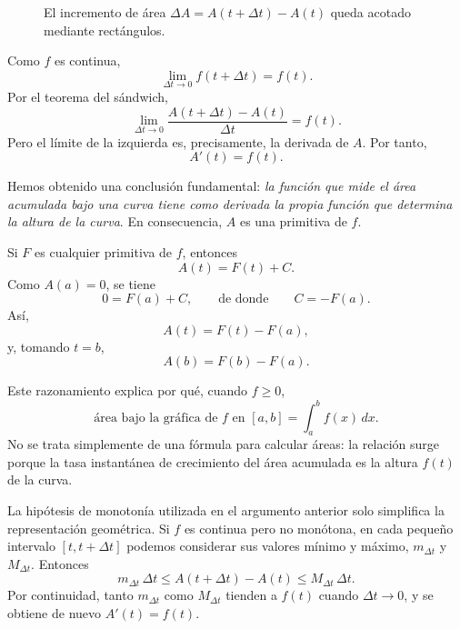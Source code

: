 \begin{figure}[htbp]
\centering
{}
\caption{El incremento de área $\Delta A=A(t+\Delta t)-A(t)$ queda acotado mediante rectángulos.}
\label{fig:incremento-area}
\end{figure}

Como $f$ es continua,
\[
\lim_{\Delta t\to0}f(t+\Delta t)=f(t).
\]
Por el teorema del sándwich,
\[
\lim_{\Delta t\to0}
\frac{A(t+\Delta t)-A(t)}{\Delta t}
=f(t).
\]
Pero el límite de la izquierda es, precisamente, la derivada de $A$. Por tanto,
\[
\boxed{A'(t)=f(t).}
\]

Hemos obtenido una conclusión fundamental: \emph{la función que mide el área acumulada bajo una curva tiene como derivada la propia función que determina la altura de la curva}. En consecuencia, $A$ es una primitiva de $f$.

Si $F$ es cualquier primitiva de $f$, entonces
\[
A(t)=F(t)+C.
\]
Como $A(a)=0$, se tiene
\[
0=F(a)+C,
\qquad\text{de donde}\qquad
C=-F(a).
\]
Así,
\[
A(t)=F(t)-F(a),
\]
y, tomando $t=b$,
\[
\boxed{A(b)=F(b)-F(a).}
\]

Este razonamiento explica por qué, cuando $f\geq0$,
\[
\boxed{\text{área bajo la gráfica de $f$ en $[a,b]$}=\int_a^b f(x)\,dx.}
\]
No se trata simplemente de una fórmula para calcular áreas: la relación surge porque la tasa instantánea de crecimiento del área acumulada es la altura $f(t)$ de la curva.

La hipótesis de monotonía utilizada en el argumento anterior solo simplifica la representación geométrica. Si $f$ es continua pero no monótona, en cada pequeño intervalo $[t,t+\Delta t]$ podemos considerar sus valores mínimo y máximo, $m_{\Delta t}$ y $M_{\Delta t}$. Entonces
\[
m_{\Delta t}\,\Delta t
\leq
A(t+\Delta t)-A(t)
\leq
M_{\Delta t}\,\Delta t.
\]
Por continuidad, tanto $m_{\Delta t}$ como $M_{\Delta t}$ tienden a $f(t)$ cuando $\Delta t\to0$, y se obtiene de nuevo $A'(t)=f(t)$.

